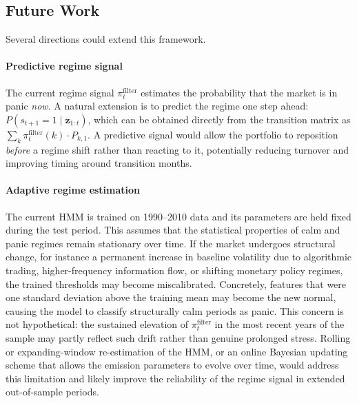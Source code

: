 

\subsection{Future Work}\label{sec:future_work_full}

Several directions could extend this framework.

\paragraph{Predictive regime signal}
The current regime signal $\pi_t^{\text{filter}}$ estimates the probability that the market is in panic \emph{now}. A natural extension is to predict the regime one step ahead: $P(s_{t+1} = 1 \mid \mathbf{z}_{1:t})$, which can be obtained directly from the transition matrix as $\sum_k \pi_t^{\text{filter}}(k) \cdot P_{k,1}$. A predictive signal would allow the portfolio to reposition \emph{before} a regime shift rather than reacting to it, potentially reducing turnover and improving timing around transition months.

\paragraph{Adaptive regime estimation}
The current HMM is trained on 1990--2010 data and its parameters are held fixed during the test period. This assumes that the statistical properties of calm and panic regimes remain stationary over time. If the market undergoes structural change, for instance a permanent increase in baseline volatility due to algorithmic trading, higher-frequency information flow, or shifting monetary policy regimes, the trained thresholds may become miscalibrated. Concretely, features that were one standard deviation above the training mean may become the new normal, causing the model to classify structurally calm periods as panic. This concern is not hypothetical: the sustained elevation of $\pi_t^{\text{filter}}$ in the most recent years of the sample may partly reflect such drift rather than genuine prolonged stress. Rolling or expanding-window re-estimation of the HMM, or an online Bayesian updating scheme that allows the emission parameters to evolve over time, would address this limitation and likely improve the reliability of the regime signal in extended out-of-sample periods.

